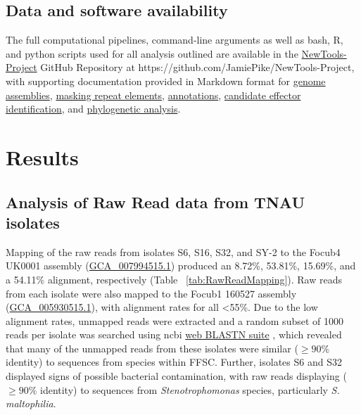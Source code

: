 \subsection{Data and software availability}

The full computational pipelines, command-line arguments as well as bash, R, and python scripts used for all analysis outlined are available in the \href{https://github.com/JamiePike/NewTools-Project}{NewTools-Project} GitHub Repository at https://github.com/JamiePike/NewTools-Project, with supporting documentation provided in Markdown format for \href{https://github.com/JamiePike/NewTools-Project/blob/master/docs/Assembly/AssemblyNotes.md}{genome assemblies}, \href{https://github.com/JamiePike/NewTools-Project/blob/master/docs/Annotations/RepeatMaskingNotes.md}{masking repeat elements}, \href{https://github.com/JamiePike/NewTools-Project/blob/master/docs/Annotations/Annotations.md}{annotations}, \href{https://github.com/JamiePike/NewTools-Project/blob/master/docs/Effectors/PredicitionofCandidateEffectors.md}{candidate effector identification}, and \href{https://github.com/JamiePike/NewTools-Project/blob/master/docs/Phylogeny/Phylogenies.md}{phylogenetic analysis}.

\newpage
\section{Results}

\subsection{Analysis of Raw Read data from TNAU isolates}

Mapping of the raw reads from isolates S6, S16, S32, and SY-2 to the \ac{Focub4} UK0001 assembly (\href{https://www.ncbi.nlm.nih.gov/datasets/genome/GCA_007994515.1/}{GCA\_007994515.1}) produced an 8.72\%, 53.81\%, 15.69\%, and a 54.11\% alignment, respectively (Table ~\ref{tab:RawReadMapping}). Raw reads from each isolate were also mapped to the \ac{Focub1} 160527 assembly
 (\href{https://www.ncbi.nlm.nih.gov/datasets/genome/GCA_005930515.1/}{GCA\_005930515.1}), with alignment rates for all \textless 55\%. Due to the low alignment rates, unmapped reads were extracted and a random subset of 1000 reads per isolate was searched using \ac{ncbi} \href{https://blast.ncbi.nlm.nih.gov/Blast.cgi?PROGRAM=blastn&BLAST_SPEC=GeoBlast&PAGE_TYPE=BlastSearch}{web BLASTN suite} \parencite{Nih2014}, which revealed that many of the unmapped reads from these isolates were similar ($\geq90\% $ identity) to sequences from species within \ac{FFSC}. Further, isolates S6 and S32 displayed signs of possible bacterial contamination, with raw reads displaying ($ \geq90\% $ identity) to sequences from \textit{Stenotrophomonas} species, particularly \textit{S. maltophilia}. 


